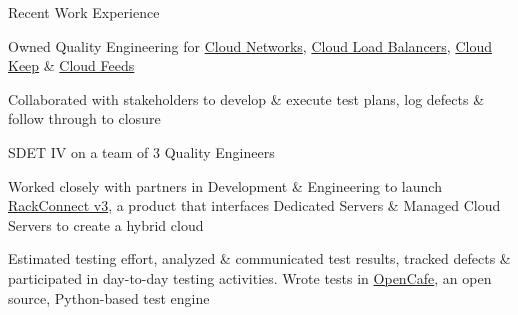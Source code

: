 \documentclass{resume} %
\begin{document}
\begin{rSection}{Recent Work Experience}
\begin{rSubsection}{}{}{}{}
\item Owned Quality Engineering for \href{https://www.rackspace.com/openstack/public/networks}{Cloud Networks}, \href{https://www.rackspace.com/openstack/public/load-balancing}{Cloud Load Balancers}, \href{https://www.youtube.com/watch?v=BY4iVTbGk30}{Cloud Keep} \& \href{https://support.rackspace.com/how-to/cloud-feeds-overview/}{Cloud Feeds}
\item Collaborated with stakeholders to develop \& execute test plans, log defects \& follow through to closure

\end{rSubsection}\vspace{-1em}






  \begin{rSubsection}{}{}{}{}
{SDET IV on a team of 3 Quality Engineers}

\item Worked closely with partners in Development \& Engineering to launch \href{https://support.rackspace.com/how-to/introducing-rackconnect-v30/}{RackConnect v3}, a product that interfaces Dedicated Servers \& Managed Cloud Servers to create a hybrid cloud
\item Estimated testing effort, analyzed \& communicated test results, tracked defects \& participated in day-to-day testing activities. Wrote tests in \href{https://github.com/CafeHub/opencafe}{OpenCafe}, an open source, Python-based test engine

\end{rSubsection}






\end{rSection}
\end{document}
